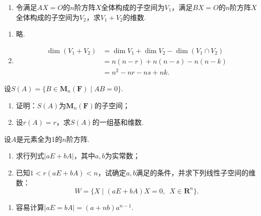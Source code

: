 \begin{exercise}
\begin{exgroup}
\begin{enumerate}
            \item 令满足$AX=O$的$n$阶方阵$X$全体构成的子空间为$V_1$，满足$BX=O$的$n$阶方阵$X$全体构成的子空间为$V_2$，求$V_1+V_2$的维数.
        \end{enumerate}
        \begin{answer}
            \begin{enumerate}
                \item 略.

                \item \begin{align*}
                          \dim(V_1+V_2) & =\dim V_1+\dim V_2-\dim(V_1\cap V_2) \\
                                        & =n(n-r)+n(n-s)-n(n-k) \\
                                        & =n^2-nr-ns+nk.
                      \end{align*}
            \end{enumerate}
        \end{answer}

        \item 设$S(A)=\{B \in \mathbf{M}_n(\mathbf{F}) \mid AB=0\}$.
        \begin{enumerate}
            \item 证明：$S(A)$为$\mathbf{M}_n(\mathbf{F})$的子空间；

            \item 设$r(A)=r$，求$S(A)$的一组基和维数.
        \end{enumerate}

        \item 设$A$是元素全为1的$n$阶方阵.
        \begin{enumerate}
            \item 求行列式$|aE+bA|$，其中$a,b$为实常数；

            \item 已知$1<r(aE+bA)<n$，试确定$a,b$满足的条件，并求下列线性子空间的维数：
                  \[W=\{X \mid (aE+bA)X=0,\enspace X\in\mathbf{R}^n\}.\]
        \end{enumerate}
        \begin{answer}
            \begin{enumerate}
                \item 容易计算$|aE=bA|=(a+nb)a^{n-1}$.


\end{enumerate}
\end{answer}
\end{exgroup}
\end{exercise}
